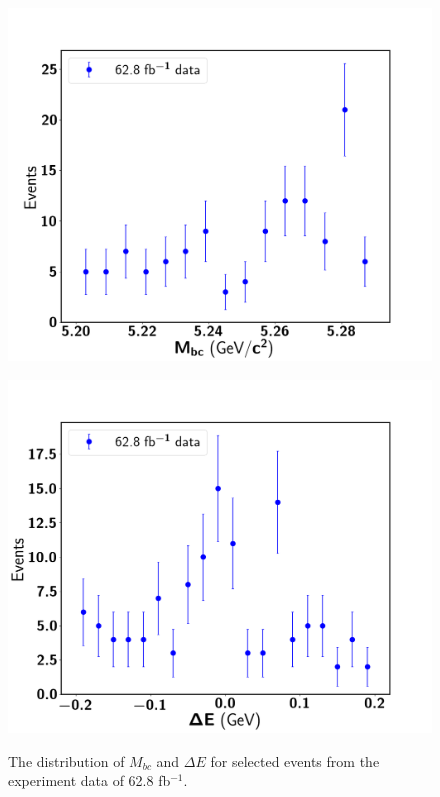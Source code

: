 \begin{figure}[htpb]
	\begin{minipage}[b]{0.5\linewidth}
		\centering 
		\includegraphics[width=1\linewidth]{figures/hist_stacked_data_mbc_}
		\label{}
	\end{minipage}
	\begin{minipage}[b]{0.5\linewidth}
		\centering 
		\includegraphics[width=1\linewidth]{figures/hist_stacked_data_dE_}
		\label{}
	\end{minipage}
	\caption{The distribution  of $M_{bc}$ and $\Delta E$ for selected events from the experiment data of 62.8 fb$^{-1}$.}
	\label{fig:2Ddatastack}
\end{figure}

